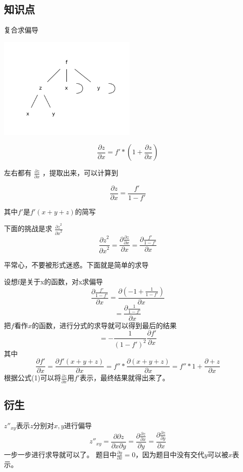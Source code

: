 \documentclass[a4paper]{ctexart}
\begin{document}
\begin{multicols}{2}
\subsection{知识点}
复合求偏导
\begin{center}
\includegraphics[height=5cm]{split.pdf}
\end{center}
$$
\frac{ \partial z } {\partial x}
 = 
 f' * (1 + 
    \frac{\partial z}
    { \partial x}
    )
$$
\par
左右都有
$ \frac{ \partial z } {\partial x} $
，提取出来，可以计算到

\begin{equation}
\frac{
    \partial z
}
{
    \partial x
}
 = 
 \frac{f'} {1 - f'}
\end{equation}
\par 其中$f'$是$f'(x+y+z)$的简写
\par 下面的挑战是求
$
\frac{{\partial z}^2}
{{\partial x}^2}
$
\begin{equation}
\frac{{\partial z}^2}
{{\partial x}^2}
=
\frac{
    \partial
    \frac{
        \partial z
    }
    {
        \partial x
    }
}
{\partial x}
=
\frac{
     \partial \frac{f'} {1 - f'}
}
{
    \partial x
}
\end{equation}
\par 平常心，不要被形式迷惑。下面就是简单的求导
\par 设想f是关于x的函数，对x求偏导
$$
\frac{
     \partial \frac{f'} {1 - f'}
}
{
    \partial x
}
=
\frac{
     \partial (-1 + \frac{1} {1 - f'})
}
{
    \partial x
}
$$
$$
= 
\frac{
    \partial \frac{1}{1-f'}
}
{\partial x}
$$
把$f$看作$x$的函数，进行分式的求导就可以得到最后的结果
$$
=
- \frac{1}{(1-f')^2}
\frac{\partial f'}
{\partial x}
$$
其中
$$
\frac{\partial f'}
{\partial x}
=
\frac{\partial f'(x+y+z)}
{\partial x}
= 
f{''}
* 
\frac{\partial (x+y+z)}
{\partial x}
=
f{''}
* 
1 + 
\frac{\partial +z}
{\partial x}
$$
根据公式(1)可以将$\frac{\partial z}{\partial x}$用$f'$表示，最终结果就得出来了。

\subsection{衍生}
$z''_{xy}$表示$z$分别对$x,y$进行偏导
$$
z''_{xy}
=
\frac{\partial \partial z}
{\partial x\partial y}
=
\frac{\partial \frac{\partial z}{\partial x}}
{\partial y}
=
\frac{\partial \frac{\partial z}{\partial y}}
{\partial x}
$$
一步一步进行求导就可以了。
题目中$\frac{\partial y}{\partial x}=0$，因为题目中没有交代$y$可以被$x$表示。


\end{multicols}
\end{document}
